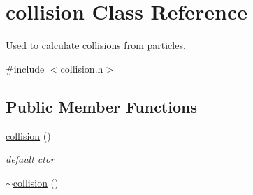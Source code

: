 \hypertarget{classcollision}{\section{collision Class Reference}
\label{classcollision}
}


Used to calculate collisions from particles.  




{\ttfamily \#include $<$collision.\-h$>$}

\subsection*{Public Member Functions}
\begin{DoxyCompactItemize}
\item 
\hypertarget{classcollision_af81d083d1231af3936a07cc145835447}{\hyperlink{classcollision_af81d083d1231af3936a07cc145835447}{collision} ()}\label{classcollision_af81d083d1231af3936a07cc145835447}

\begin{DoxyCompactList}\small\item\em default ctor \end{DoxyCompactList}\item 
\hypertarget{classcollision_af3904c7b02c25aed19a514a04a88644b}{\hyperlink{classcollision_af3904c7b02c25aed19a514a04a88644b}{$\sim$collision} ()}\label{classcollision_af3904c7b02c25aed19a514a04a88644b}


\end{DoxyCompactItemize}
